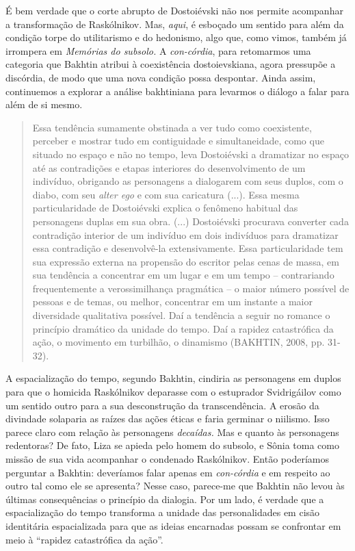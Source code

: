 É bem verdade que o corte abrupto de Dostoiévski não nos permite
acompanhar a transformação de Raskólnikov. Mas, \emph{aqui}, é esboçado
um sentido para além da condição torpe do utilitarismo e do hedonismo,
algo que, como vimos, também já irrompera em \emph{Memórias do subsolo.}
A \emph{con-córdia}, para retomarmos uma categoria que Bakhtin atribui à
coexistência dostoievskiana, agora pressupõe a discórdia, de modo que
uma nova condição possa despontar. Ainda assim, continuemos a explorar a
análise bakhtiniana para levarmos o diálogo a falar para além de si
mesmo.

\begin{quote}
Essa tendência sumamente obstinada a ver tudo como coexistente, perceber
e mostrar tudo em contiguidade e simultaneidade, como que situado no
espaço e não no tempo, leva Dostoiévski a dramatizar no espaço até as
contradições e etapas interiores do desenvolvimento de um indivíduo,
obrigando as personagens a dialogarem com seus duplos, com o diabo, com
seu \emph{alter ego} e com sua caricatura (...). Essa mesma
particularidade de Dostoiévski explica o fenômeno habitual das
personagens duplas em sua obra. (...) Dostoiévski procurava converter
cada contradição interior de um indivíduo em dois indivíduos para
dramatizar essa contradição e desenvolvê-la extensivamente. Essa
particularidade tem sua expressão externa na propensão do escritor pelas
cenas de massa, em sua tendência a concentrar em um lugar e em um tempo
-- contrariando frequentemente a verossimilhança pragmática -- o maior
número possível de pessoas e de temas, ou melhor, concentrar em um
instante a maior diversidade qualitativa possível. Daí a tendência a
seguir no romance o princípio dramático da unidade do tempo. Daí a
rapidez catastrófica da ação, o movimento em turbilhão, o dinamismo
(BAKHTIN, 2008, pp. 31-32).
\end{quote}

A espacialização do tempo, segundo Bakhtin, cindiria as personagens em
duplos para que o homicida Raskólnikov deparasse com o estuprador
Svidrigáilov como um sentido outro para a sua desconstrução da
transcendência. A erosão da divindade solaparia as raízes das ações
éticas e faria germinar o niilismo. Isso parece claro com relação às
personagens \emph{decaídas.} Mas e quanto às personagens redentoras? De
fato, Liza se apieda pelo homem do subsolo, e Sônia toma como missão de
sua vida acompanhar o condenado Raskólnikov. Então poderíamos perguntar
a Bakhtin: deveríamos falar apenas em \emph{con-córdia} e em respeito ao
outro tal como ele se apresenta? Nesse caso, parece-me que Bakhtin não
levou às últimas consequências o princípio da dialogia. Por um lado, é
verdade que a espacialização do tempo transforma a unidade das
personalidades em cisão identitária espacializada para que as ideias
encarnadas possam se confrontar em meio à ``rapidez catastrófica da
ação''.

